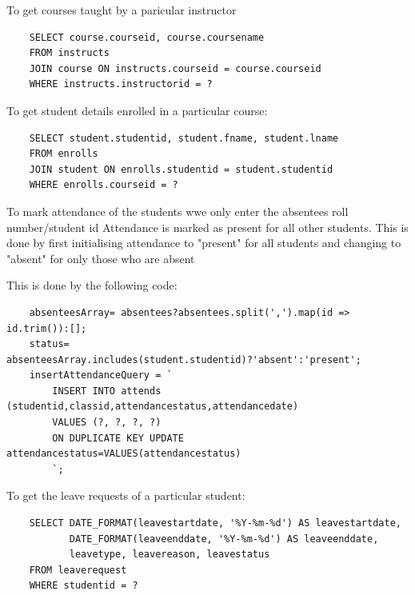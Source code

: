 \documentclass{article}
\begin{document}
\begin{large}
\begin{verbatim}
    \end{verbatim}

    \vspace*{0.5cm}
    \par
    To get courses taught by a paricular instructor
    \begin{verbatim}
    SELECT course.courseid, course.coursename 
    FROM instructs 
    JOIN course ON instructs.courseid = course.courseid 
    WHERE instructs.instructorid = ?
    \end{verbatim}


    \vspace*{0.5cm}
    \par
    To get student details enrolled in a particular course:
    \begin{verbatim}
    SELECT student.studentid, student.fname, student.lname 
    FROM enrolls 
    JOIN student ON enrolls.studentid = student.studentid 
    WHERE enrolls.courseid = ?
    \end{verbatim}

    \vspace*{0.5cm}
    \par

    To mark attendance of the students wwe only enter the absentees roll number/student id 
    Attendance is marked as present for all other students. This is done by first initialising 
    attendance to "present" for all students and changing to "absent" for only those who are absent

    \newpage

    This is done by the following code:

    \begin{verbatim}
    absenteesArray= absentees?absentees.split(',').map(id => id.trim()):[];
    status= absenteesArray.includes(student.studentid)?'absent':'present';
    insertAttendanceQuery = `
        INSERT INTO attends (studentid,classid,attendancestatus,attendancedate)
        VALUES (?, ?, ?, ?)
        ON DUPLICATE KEY UPDATE attendancestatus=VALUES(attendancestatus)
        `;
    \end{verbatim}

    \vspace*{0.5cm}
    To get the leave requests of a particular student:
    \begin{verbatim}
    SELECT DATE_FORMAT(leavestartdate, '%Y-%m-%d') AS leavestartdate,
           DATE_FORMAT(leaveenddate, '%Y-%m-%d') AS leaveenddate,
           leavetype, leavereason, leavestatus
    FROM leaverequest
    WHERE studentid = ?
    \end{verbatim}  



\end{large}
\end{document}
